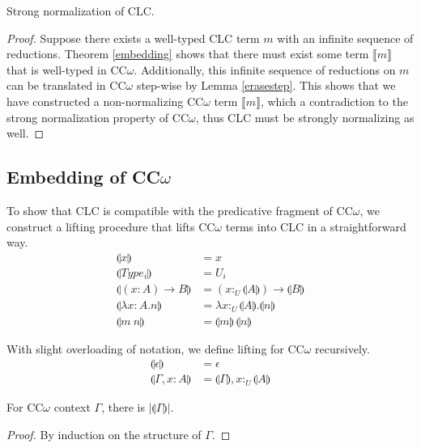 \documentclass[sigplan,screen,review,anonymous]{acmart}
\newcommand{\pure}[1]{|#1|}
\newcommand{\utype}{:_{\scriptscriptstyle U}}
\newcommand{\erase}[1]{\llbracket #1 \rrbracket}
\newcommand{\lift}[1]{\llparenthesis #1 \rrparenthesis}
\begin{document}
\begin{theorem}
  Strong normalization of CLC.
\end{theorem}
\begin{proof}
  Suppose there exists a well-typed CLC term $m$ with an infinite sequence of reductions. Theorem \ref{embedding} shows that there must exist some term $\erase{m}$ that is well-typed in CC$\omega$. Additionally, this infinite sequence of reductions on $m$ can be translated in CC$\omega$ step-wise by Lemma \ref{erasestep}. This shows that we have constructed a non-normalizing CC$\omega$ term $\erase{m}$, which a contradiction to the strong normalization property of CC$\omega$, thus CLC must be strongly normalizing as well.
\end{proof}

\subsection{Embedding of CC$\omega$}
To show that CLC is compatible with the predicative fragment of CC$\omega$, we construct a lifting procedure that lifts CC$\omega$ terms into CLC in a straightforward way.
\begin{align*}
  \lift{x}                     & = x                                        \\
  \lift{Type_i}                & = U_i                                      \\
  \lift{(x : A) \rightarrow B} & = (x \utype \lift{A}) \rightarrow \lift{B} \\
  \lift{\lambda x : A.n}       & = \lambda x\utype\lift{A}.\lift{n}         \\
  \lift{m\ n}                  & = \lift{m}\ \lift{n}
\end{align*}

With slight overloading of notation, we define lifting for CC$\omega$ recursively.
\begin{align*}
  \lift{\epsilon}      & = \epsilon                         \\
  \lift{\Gamma, x : A} & = \lift{\Gamma}, x \utype \lift{A}
\end{align*}

\begin{lemma}
  For CC$\omega$ context $\Gamma$, there is $\pure{\lift{\Gamma}}$.
\end{lemma}
\begin{proof}
  By induction on the structure of $\Gamma$.
\end{proof}
\end{document}
